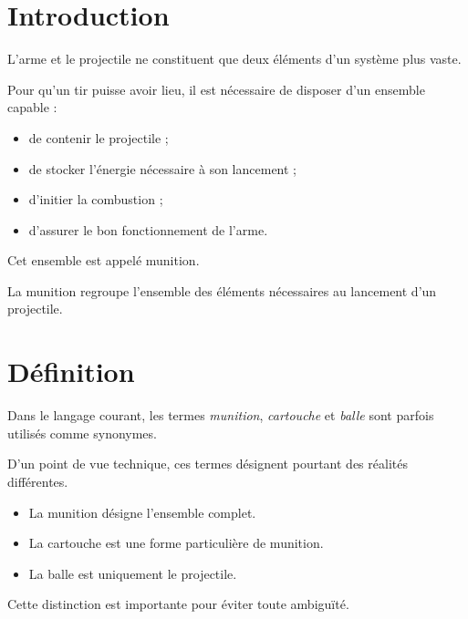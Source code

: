 
\section{Introduction}

L'arme et le projectile ne constituent que deux éléments d'un système plus
vaste.

Pour qu'un tir puisse avoir lieu, il est nécessaire de disposer d'un ensemble
capable :

\begin{itemize}
    \item de contenir le projectile ;
    \item de stocker l'énergie nécessaire à son lancement ;
    \item d'initier la combustion ;
    \item d'assurer le bon fonctionnement de l'arme.
\end{itemize}

Cet ensemble est appelé munition.

\begin{aretenir}

La munition regroupe l'ensemble des éléments nécessaires au lancement d'un
projectile.

\end{aretenir}

\section{Définition}

Dans le langage courant, les termes \emph{munition}, \emph{cartouche} et
\emph{balle} sont parfois utilisés comme synonymes.

D'un point de vue technique, ces termes désignent pourtant des réalités
différentes.

\begin{itemize}
    \item La munition désigne l'ensemble complet.
    \item La cartouche est une forme particulière de munition.
    \item La balle est uniquement le projectile.
\end{itemize}

Cette distinction est importante pour éviter toute ambiguïté.

